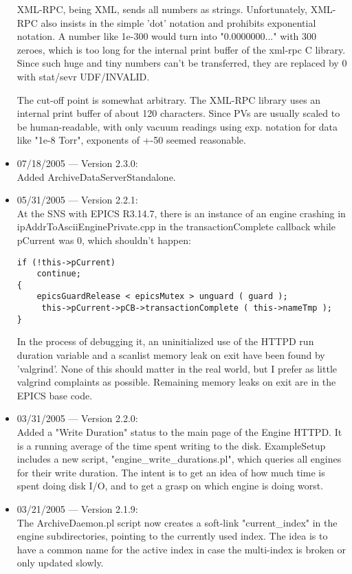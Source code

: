 \begin{itemize}
XML-RPC, being XML, sends all numbers as strings.
Unfortunately, XML-RPC also insists in the simple 'dot'
notation and prohibits exponential notation.
A number like 1e-300 would turn into
"0.0000000..." with 300 zeroes,
which is too long for the internal print buffer of
the xml-rpc C library.
Since such huge and tiny numbers can't be transferred,
they are replaced by 0 with stat/sevr UDF/INVALID.

The cut-off point is somewhat arbitrary.
The XML-RPC library uses an internal print buffer
of about 120 characters.
Since PVs are usually scaled to be human-readable,
with only vacuum readings using exp. notation for
data like "1e-8 Torr", exponents of +-50 seemed
reasonable.

\item 07/18/2005 --- Version 2.3.0:\\
Added ArchiveDataServerStandalone.

\item 05/31/2005 --- Version 2.2.1:\\
At the SNS with EPICS R3.14.7, there is an instance of an engine crashing in
ipAddrToAsciiEnginePrivate.cpp in the transactionComplete callback while
pCurrent was 0, which shouldn't happen:
\begin{verbatim}
if (!this->pCurrent)
    continue;
{
    epicsGuardRelease < epicsMutex > unguard ( guard );
     this->pCurrent->pCB->transactionComplete ( this->nameTmp );
}
\end{verbatim}

In the process of debugging it, an uninitialized use of the HTTPD run duration
variable and a scanlist memory leak on exit have been found by 'valgrind'.
None of this should matter in the real world, but I prefer as little valgrind
complaints as possible. Remaining memory leaks on exit are in the EPICS base
code.

\item 03/31/2005 --- Version 2.2.0:\\
Added a "Write Duration" status to the main
page of the Engine HTTPD.
It is a running average of the time spent
writing to the disk.
ExampleSetup includes a new script,
"engine\_write\_durations.pl",
which queries all engines for their write duration.
The intent is to get an idea of how much time
is spent doing disk I/O, and to get a grasp on
which engine is doing worst.

\item 03/21/2005 --- Version 2.1.9:\\
The ArchiveDaemon.pl script now creates a soft-link
"current\_index" in the engine subdirectories,
pointing to the currently used index.
The idea is to have a common name for the active index
in case the multi-index is broken or only updated
slowly.


\end{itemize}
